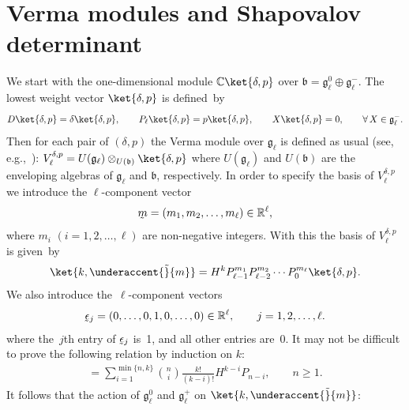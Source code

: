 \documentclass[pdftex]{sigma}
\numberwithin{equation}{section}
\begin{document}
\section{Verma modules and Shapovalov determinant}
\label{SEC:VM}

We start with the one-dimensional module $ {\mathbb C} \ket{\delta,p} $ over $ {\mathfrak b} = {\mathfrak g}_{\ell}^0
\oplus {\mathfrak g}_{\ell}^-$. The lowest weight vector $ \ket{\delta,p} $ is def\/ined~by
\begin{gather*}
D \ket{\delta,p} = \delta \ket{\delta,p},
\qquad
P_{\ell} \ket{\delta,p} = p \ket{\delta,p},
\qquad
X \ket{\delta,p} = 0,
\qquad
 \forall \, X \in {\mathfrak g}_{\ell}^-.
\end{gather*}
Then for each pair of $(\delta,p) $ the Verma module over $ {\mathfrak g}_{\ell} $ is def\/ined as usual (see, e.g.,~\cite{Dix}): $ V^{\delta,p}_{\ell} = U({\mathfrak g}_{\ell}) \otimes_{U({\mathfrak b})} \ket{\delta,p} $ where $U({\mathfrak g}_{\ell})$ and $ U({\mathfrak b}) $ are the enveloping algebras of $ {\mathfrak g}_{\ell} $ and $
\mathfrak b$, respectively.
In order to specify the basis of $ V^{\delta,p}_{\ell} $ we introduce the $ \ell$-component vector
\begin{gather*}
\underaccent{\tilde}{m} = (m_1, m_2, \dots, m_{\ell})  \in {\mathbb R}^{\ell},
\end{gather*}
where $ m_i$ $(i=1,2,\dots,\ell) $ are non-negative integers.
With this the basis of $ V^{\delta,p}_{\ell} $ is given~by
\begin{gather}
\ket{k,\underaccent{\tilde}{m}} = H^k P_{\ell-1}^{m_1} P_{\ell-2}^{m_2} \cdots P_0^{m_{\ell}} \ket{\delta,p}.
\label{anyl-basis}
\end{gather}
We also introduce the~$\ell$-component vectors
\begin{gather*}
\underaccent{\tilde}{\epsilon}_j = (0, \dots, 0, 1, 0, \dots,0) \in {\mathbb R}^{\ell},
\qquad
j=1,2,\dots, \ell.
\end{gather*}
where the~$j$th entry of $\underaccent{\tilde}{\epsilon}_j $ is~1, and all other entries are~0.
It may not be dif\/f\/icult to prove the following relation by induction on $k$:
\begin{gather}
[P_n, H^k] = \sum\limits_{i=1}^{\min\{n,k\}} \binom{n}{i} \frac{k!}{(k-i)!}  H^{k-i}   P_{n-i},
\qquad
n \geq 1.
\label{PnHkcomm}
\end{gather}
It follows that the action of $ {\mathfrak g}_{\ell}^0$ and ${\mathfrak g}_{\ell}^+$ on $\ket{k,\underaccent{\tilde}{m}}$:
\end{document}
